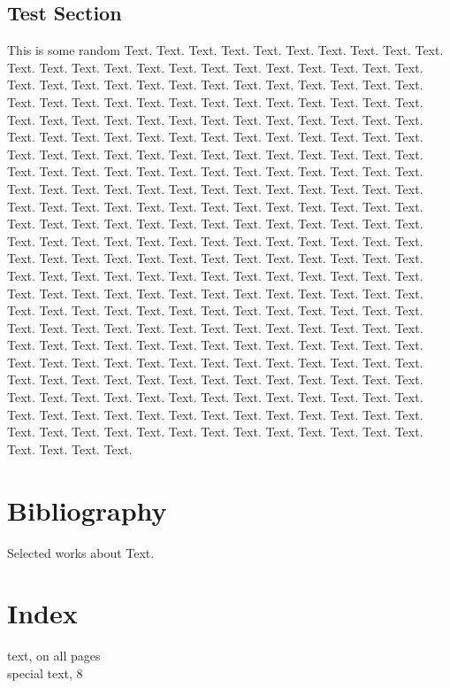 \documentclass{book}
\begin{document}
\section{Test Section}
This is some random Text. Text. Text. Text. Text. Text. Text. Text. Text. Text. Text. Text. Text. Text. Text. Text. Text. Text. Text. Text. Text. Text. Text. Text. Text. Text. Text. Text. Text. Text. Text. Text. Text. Text. Text. Text. Text. Text. Text. Text. Text. Text. Text. Text. Text. Text. Text. Text. Text. Text. Text. Text. Text. Text. Text. Text. Text. Text. Text. Text. Text. Text. Text. Text. Text. Text. Text. Text. Text. Text. Text. Text. Text. Text. Text. Text. Text. Text. Text. Text. Text. Text. Text. Text. Text. Text. Text. Text. Text. Text. Text. Text. Text. Text. Text. Text. Text. Text. Text. Text. Text. Text. Text. Text. Text. Text. Text. Text. Text. Text. Text. Text. Text. Text. Text. Text. Text. Text. Text. Text. Text. Text. Text. Text. Text. Text. Text. Text. Text. Text. Text. Text. Text. Text. Text. Text. Text. Text. Text. Text. Text. Text. Text. Text. Text. Text. Text. Text. Text. Text. Text. Text. Text. Text. Text. Text. Text. Text. Text. Text. Text. Text. Text. Text. Text. Text. Text. Text. Text. Text. Text. Text. Text. Text. Text. Text. Text. Text. Text. Text. Text. Text. Text. Text. Text. Text. Text. Text. Text. Text. Text. Text. Text. Text. Text. Text. Text. Text. Text. Text. Text. Text. Text. Text. Text. Text. Text. Text. Text. Text. Text. Text. Text. Text. Text. Text. Text. Text. Text. Text. Text. Text. Text. Text. Text. Text. Text. Text. Text. Text. Text. Text. Text. Text. Text. Text. Text. Text. Text. Text. Text. Text. Text. Text. Text. Text. Text. Text. Text. Text. Text. Text. Text. Text. Text. Text. Text. Text. Text. Text. Text. Text. Text. Text. Text. Text. Text. Text. Text. Text. Text. Text. Text. Text. Text. Text. Text. Text. Text. Text. Text. Text. Text. Text. Text. Text. Text. Text. Text. Text. Text. Text. Text. Text. Text. Text. Text. Text. Text. Text.

\backmatter

\chapter{Bibliography}

Selected works about Text.

\chapter{Index}

text, on all pages\\
special text, 8
\end{document}
